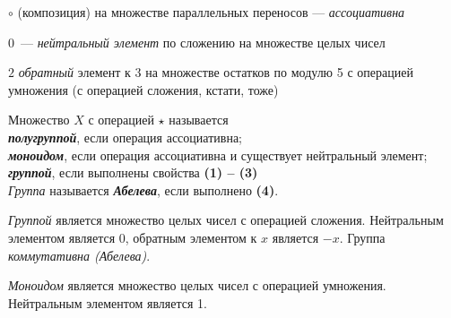 \documentclass{article}
\begin{document}
\begin{example}
	 $\circ$ (композиция) на множестве параллельных переносов --- \textit{ассоциативна}
 \end{example}
\begin{example}
	 $0$~--- \textit{нейтральный элемент} по сложению на множестве целых чисел
\end{example}
\begin{example}
	$ 2 $ \textit{обратный} элемент к $ 3 $ на множестве остатков по модулю 5 с операцией умножения (с операцией сложения, кстати, тоже)
\end{example}

\begin{definition_boxed}
Множество $X$ с операцией $\star$ называется\\
\textit{\textbf{полугруппой}}, если операция ассоциативна;\\
\textbf{\textit{моноидом}}, если операция ассоциативна и существует нейтральный элемент;\\
\textbf{\textit{группой}}, если выполнены свойства \textbf{(1) -- (3)}\\
\textit{Группа} называется \textbf{\textit{Абелева}}, если выполнено \textbf{(4)}.
\end{definition_boxed}

\begin{example}
	\textit{Группой} является множество целых чисел с операцией сложения. Нейтральным элементом является 0, обратным элементом к $x$ является $-x$. Группа \textit{коммутативна (Абелева)}.
\end{example}

\begin{example}
\textit{Моноидом} является множество целых чисел с операцией умножения. Нейтральным элементом является 1.
\end{example}
\end{document}
